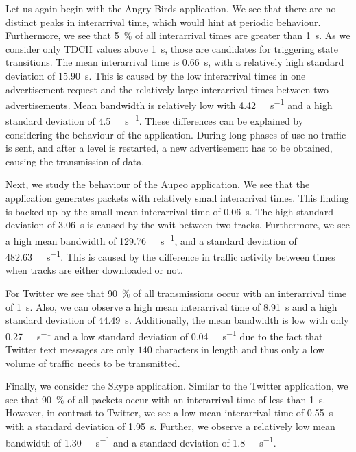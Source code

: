 Let us again begin with the Angry Birds application.
We see that there are no distinct peaks in interarrival time, which would hint at periodic behaviour.
Furthermore, we see that \SI{5}{\percent} of all interarrival times are greater than \SI{1}{\second}.
As we consider only \gls{TDCH} values above \SI{1}{\second}, those are candidates for triggering state transitions.
The mean interarrival time is \SI{0.66}{\second}, with a relatively high standard deviation of \SI{15.90}{\second}.
This is caused by the low interarrival times in one advertisement request and the relatively large interarrival times between two advertisements.
Mean bandwidth is relatively low with \SI{4.42}{\kilo\bit\per\second} and a high standard deviation of \SI{4.5}{\kilo\bit\per\second}.
These differences can be explained by considering the behaviour of the application.
During long phases of use no traffic is sent, and after a level is restarted, a new advertisement has to be obtained, causing the transmission of data.

Next, we study the behaviour of the Aupeo application.
We see that the application generates packets with relatively small interarrival times.
This finding is backed up by the small mean interarrival time of \SI{0.06}{\second}.
The high standard deviation of \SI{3.06}{\second} is caused by the wait between two tracks.
Furthermore, we see a high mean bandwidth of \SI{129.76}{\kilo\bit\per\second}, and a standard deviation of \SI{482.63}{\kilo\bit\per\second}.
This is caused by the difference in traffic activity between times when tracks are either downloaded or not.

For Twitter we see that \SI{90}{\percent} of all transmissions occur with an interarrival time of \SI{1}{\second}.
Also, we can observe a high mean interarrival time of \SI{8.91}{\second} and a high standard deviation of \SI{44.49}{\second}.
Additionally, the mean bandwidth is low with only \SI{0.27}{\kilo\bit\per\second} and a low standard deviation of \SI{0.04}{\kilo\bit\per\second} due to the fact that Twitter text messages are only \(140\) characters in length and thus only a low volume of traffic needs to be transmitted.

Finally, we consider the Skype application.
Similar to the Twitter application, we see that \SI{90}{\%} of all packets occur with an interarrival time of less than \SI{1}{\second}.
However, in contrast to Twitter, we see a low mean interarrival time of \SI{0.55}{\second} with a standard deviation of \SI{1.95}{\second}.
Further, we observe a relatively low mean bandwidth of \SI{1.30}{\kilo\bit\per\second} and a standard deviation of \SI{1.8}{\kilo\bit\per\second}.

